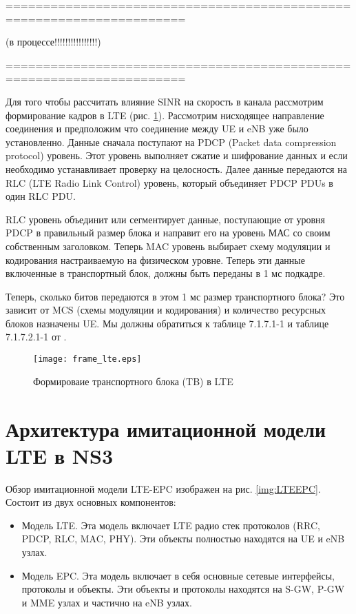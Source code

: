 ======================================================================

(в процессе!!!!!!!!!!!!!!!!)

======================================================================

Для того чтобы рассчитать влияние SINR на скорость в канала рассмотрим формирование кадров в LTE (рис. \ref{img:frame_lte}). Рассмотрим нисходящее направление соединения и предположим что соединение между UE и eNB уже было установленно. Данные сначала поступают на PDCP (Packet data compression protocol) уровень. Этот уровень выполняет сжатие и шифрование данных и если необходимо устанавливает проверку на целосность. Далее данные передаются на RLC (LTE Radio Link Control) уровень, который объединяет PDCP PDUs в один RLC PDU.

RLC уровень объединит или сегментирует данные, поступающие от уровня PDCP в правильный размер блока и направит его на уровень МАС со своим собственным заголовком. Теперь MAC уровень выбирает схему модуляции и кодирования настраиваемую на физическом уровне. Теперь эти данные включенные в транспортный блок, должны быть переданы в 1 мс подкадре.

Теперь, сколько битов передаются в этом 1 мс размер транспортного блока? Это зависит от MCS (схемы модуляции и кодирования) и количество ресурсных блоков назначены UE. Мы должны обратиться к таблице 7.1.7.1-1 и таблице 7.1.7.2.1-1 от \cite{3GPPTS36213}.

\begin{figure} [h]
  \center
\texttt{[image: frame\_lte.eps]}
  \caption{Формироваие транспортного блока (TB) в LTE}
  \label{img:frame_lte}
\end{figure}










\section{Архитектура имитационной модели LTE в NS3} \label{sect1_4}
Обзор имитационной модели LTE-EPC изображен на рис. \ref{img:LTEEPC}. Состоит из двух основных компонентов:
\begin{itemize}
  \item Модель LTE. Эта модель включает LTE радио стек протоколов (RRC, PDCP, RLC, MAC, PHY). Эти объекты полностью находятся на UE и eNB узлах.
  \item Модель EPC. Эта модель включает в себя основные сетевые интерфейсы, протоколы и объекты. Эти объекты и протоколы находятся на S-GW, P-GW и MME узлах и частично на eNB узлах. 
\end{itemize}

